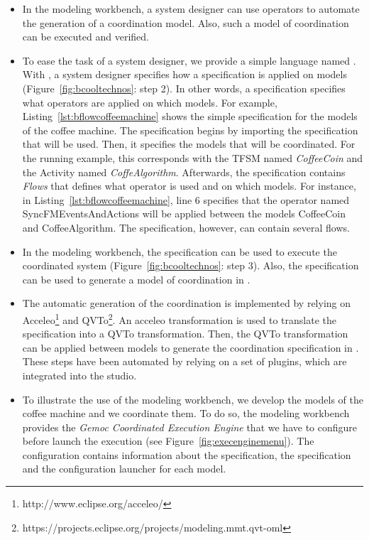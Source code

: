 \begin{itemize}
	\item In the modeling workbench, a system designer can use \bcool operators to automate the generation of a coordination model. Also, such a model of coordination can be executed and verified. 
	
	\item To ease the task of a system designer, we provide a simple language named \bflow. With \bflow, a system designer specifies how a \bcool specification is applied on models (Figure~\ref{fig:bcooltechnos}: step 2). In other words, a \bflow specification specifies what operators are applied on which models. For example, Listing~\ref{lst:bflowcoffeemachine} shows the simple \bflow specification for the models of the coffee machine. The \bflow specification begins by importing the \bcool specification that will be used. Then, it specifies the models that will be coordinated. For the running example, this corresponds with the TFSM named \emph{CoffeeCoin} and the Activity named \emph{CoffeAlgorithm}. Afterwards, the specification contains \emph{Flows} that defines what operator is used and on which models. For instance, in Listing~\ref{lst:bflowcoffeemachine}, line 6 specifies that the operator named SyncFMEventsAndActions will be applied between the models CoffeeCoin and CoffeeAlgorithm. The specification, however, can contain several flows.  
	
	\item In the modeling workbench, the \bflow specification can be used to execute the coordinated system (Figure~\ref{fig:bcooltechnos}: step 3). Also, the specification can be used to generate a model of coordination in \ccsl. 
	
	\item The automatic generation of the coordination is implemented by relying on  Acceleo\footnote{http://www.eclipse.org/acceleo/} and QVTo\footnote{https://projects.eclipse.org/projects/modeling.mmt.qvt-oml}. An acceleo transformation is used to translate the \bcool specification into a QVTo transformation. Then, the QVTo transformation can be applied between models to generate the coordination specification in \ccsl. These steps have been automated by relying on a set of plugins, which are integrated into the studio. 
	
	\item To illustrate the use of the modeling workbench, we develop the models of the coffee machine and we coordinate them. To do so, the modeling workbench provides the \emph{Gemoc Coordinated Execution Engine} that we have to configure before launch the execution (see Figure~\ref{fig:execenginemenu}). The configuration contains information about the \bcool specification, the \bflow specification and the configuration launcher for each model. 
		

\end{itemize}

